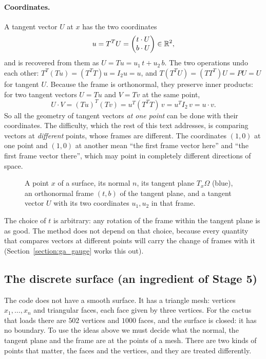 \paragraph{Coordinates.} A tangent vector $U$ at $x$ has the two coordinates
\begin{equation*}
u = T^T U = \begin{pmatrix} t \cdot U \\ b \cdot U \end{pmatrix} \in \mathbb{R}^2 ,
\end{equation*}
and is recovered from them as $U = T u = u_1\, t + u_2\, b$. The two operations undo each other: $T^T(T u) = (T^T T) u = I_2 u = u$, and $T(T^T U) = (T T^T) U = P U = U$ for tangent $U$. Because the frame is orthonormal, they preserve inner products: for two tangent vectors $U = Tu$ and $V = Tv$ at the same point,
\begin{equation*}
U\cdot V = (Tu)^T (Tv) = u^T (T^T T)\, v = u^T I_2\, v = u\cdot v .
\end{equation*}
So all the geometry of tangent vectors \emph{at one point} can be done with their coordinates. The difficulty, which the rest of this text addresses, is comparing vectors at \emph{different} points, whose frames are different. The coordinates $(1, 0)$ at one point and $(1, 0)$ at another mean ``the first frame vector here'' and ``the first frame vector there'', which may point in completely different directions of space.
\begin{figure}[t]
\centering
{}
\caption{A point $x$ of a surface, its normal $n$, its tangent plane $T_x \Omega$ (blue), an orthonormal frame $(t, b)$ of the tangent plane, and a tangent vector $U$ with its two coordinates $u_1, u_2$ in that frame.}
\label{fig:tangent_plane}
\end{figure}

The choice of $t$ is arbitrary: any rotation of the frame within the tangent plane is as good. The method does not depend on that choice, because every quantity that compares vectors at different points will carry the change of frames with it (Section~\ref{section:ga_gauge} works this out).

\subsection{The discrete surface (an ingredient of Stage 5)}
\label{section:r1_discrete_surface}

The code does not have a smooth surface. It has a triangle mesh: vertices $x_1, \ldots, x_n$ and triangular faces, each face given by three vertices. For the cactus that  loads there are $502$ vertices and $1000$ faces, and the surface is closed: it has no boundary. To use the ideas above we must decide what the normal, the tangent plane and the frame are at the points of a mesh. There are two kinds of points that matter, the faces and the vertices, and they are treated differently.

